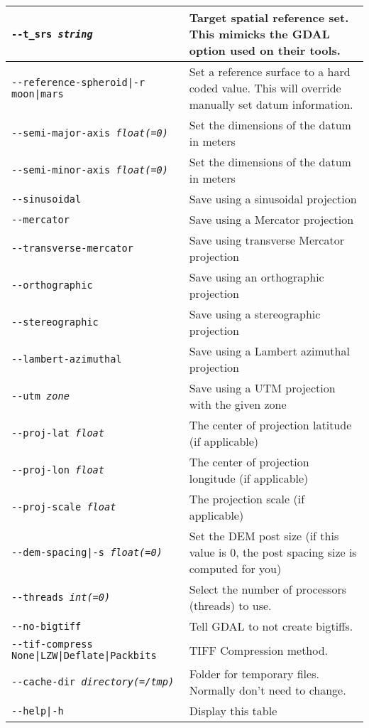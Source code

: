 \begin{longtable}{|l|p{10cm}|}
\hline
\texttt{-\/-t\_srs \textit{string}} & Target spatial reference set. This mimicks the GDAL option used on their tools. \\ \hline
\texttt{-\/-reference-spheroid|-r moon|mars} & Set a reference surface to a hard coded value. This will override manually set datum information. \\ \hline
\texttt{-\/-semi-major-axis \textit{float(=0)}} & Set the dimensions of the datum in meters\\ \hline
\texttt{-\/-semi-minor-axis \textit{float(=0)}} & Set the dimensions of the datum in meters\\ \hline
\texttt{-\/-sinusoidal} & Save using a sinusoidal projection \\ \hline
\texttt{-\/-mercator} & Save using a Mercator projection \\ \hline
\texttt{-\/-transverse-mercator} & Save using transverse Mercator projection \\ \hline
\texttt{-\/-orthographic} & Save using an orthographic projection \\ \hline
\texttt{-\/-stereographic} & Save using a stereographic projection \\ \hline
\texttt{-\/-lambert-azimuthal} & Save using a Lambert azimuthal projection \\ \hline
\texttt{-\/-utm \textit{zone}} & Save using a UTM projection with the given zone \\ \hline
\texttt{-\/-proj-lat \textit{float}} & The center of projection latitude (if applicable) \\ \hline
\texttt{-\/-proj-lon \textit{float}} & The center of projection longitude (if applicable) \\ \hline
\texttt{-\/-proj-scale \textit{float}} & The projection scale (if applicable) \\ \hline
\texttt{-\/-dem-spacing|-s \textit{float(=0)}} & Set the \ac{DEM} post size (if this value is 0, the post spacing size is computed for you) \\ \hline
\texttt{-\/-threads \textit{int(=0)}} & Select the number of processors (threads) to use.\\ \hline
\texttt{-\/-no-bigtiff} & Tell GDAL to not create bigtiffs.\\ \hline
\texttt{-\/-tif-compress None|LZW|Deflate|Packbits} & TIFF Compression method.\\ \hline
\texttt{-\/-cache-dir \textit{directory(=/tmp)}} & Folder for temporary files. Normally don't need to change.\\ \hline
\hline
\texttt{-\/-help|-h} & Display this table \\ \hline
\end{longtable}

